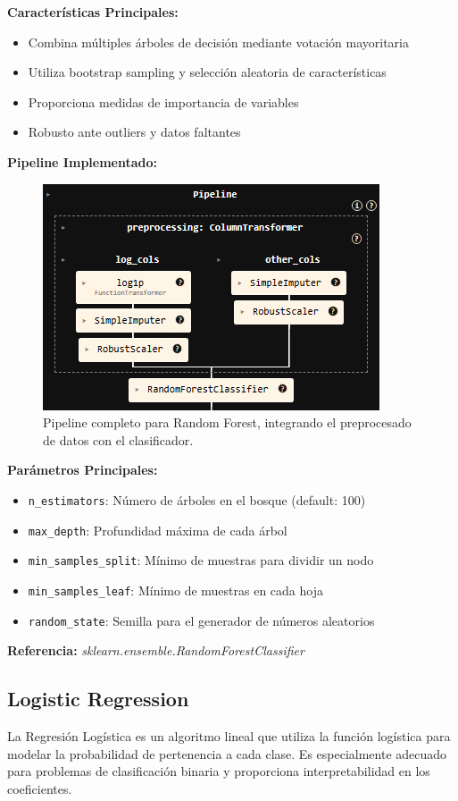 \documentclass{article}
\begin{document}
\textbf{Características Principales:}
\begin{itemize}
    \item Combina múltiples árboles de decisión mediante votación mayoritaria
    \item Utiliza bootstrap sampling y selección aleatoria de características
    \item Proporciona medidas de importancia de variables
    \item Robusto ante outliers y datos faltantes
\end{itemize}

\textbf{Pipeline Implementado:}
\begin{figure}[H]
    \centering
    \includegraphics[width=0.4\linewidth]{pipeline_random_forest.png}
    \caption{Pipeline completo para Random Forest, integrando el preprocesado de datos con el clasificador.}
    \label{fig:pipeline_rf}
\end{figure}

\textbf{Parámetros Principales:}
\begin{itemize}
    \item \texttt{n\_estimators}: Número de árboles en el bosque (default: 100)
    \item \texttt{max\_depth}: Profundidad máxima de cada árbol
    \item \texttt{min\_samples\_split}: Mínimo de muestras para dividir un nodo
    \item \texttt{min\_samples\_leaf}: Mínimo de muestras en cada hoja
    \item \texttt{random\_state}: Semilla para el generador de números aleatorios
\end{itemize}

\textbf{Referencia:} \textit{sklearn.ensemble.RandomForestClassifier} \cite{sklearn_rf}

\subsection{Logistic Regression}

La Regresión Logística es un algoritmo lineal que utiliza la función logística para modelar la probabilidad de pertenencia a cada clase. Es especialmente adecuado para problemas de clasificación binaria y proporciona interpretabilidad en los coeficientes.
\end{document}
